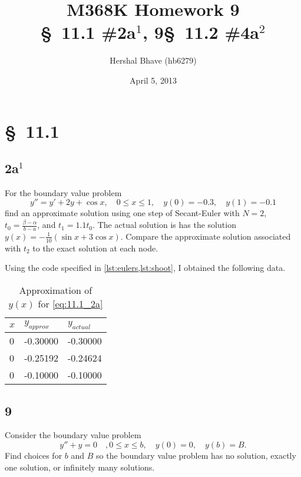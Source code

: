 \documentclass[12pt]{article}
\title{M368K Homework 9 \\
  \normalsize{\S~11.1 \#2a$^1$, 9\quad \S~11.2 \#4a$^2$}}
\author{Hershal Bhave (hb6279)}
\date{April 5, 2013}
\begin{document}
\maketitle

\section{\S~11.1}
\subsection{2a$^1$}
For the boundary value problem 
\begin{equation}
  \label{eq:11.1_2a}
  y''=y'+2y+\cos x,\quad 0\leq x \leq 1,\quad y(0)=-0.3,\quad y(1)=-0.1
\end{equation}
find an approximate solution using one step of Secant-Euler with
$N=2$, $t_0=\frac{\beta-\alpha}{b-a}$, and $t_1=1.1t_0$. The actual
solution is has the solution $y(x)=-\frac{1}{10}(\sin x + 3\cos
x)$. Compare the approximate solution associated with $t_2$ to the
exact solution at each node.

Using the code specified in \cref{lst:eulers,lst:shoot}, I obtained the following
data.

\begin{table}[h]
  \centering
  \begin{tabularx}{.5\textwidth}{XXX}
    \hline
    $x$ & $y_{approx}$ & $y_{actual}$ \\
    \hline
    0 &    -0.30000 &     -0.30000 \\
    0 &    -0.25192 &     -0.24624 \\
    0 &    -0.10000 &     -0.10000 \\
    \hline           
  \end{tabularx}
  \caption{Approximation of $y(x)$ for \cref{eq:11.1_2a}}
  \label{tab:2a_data}
\end{table}

\subsection{9}
Consider the boundary value problem 
\begin{equation}
  \label{eq:11.1_9}
  y''+y=0\quad, 0\leq x\leq b,\quad y(0)=0,\quad y(b)=B.
\end{equation}
Find choices for $b$ and $B$ so the boundary value problem has no solution, exactly one solution, or infinitely many solutions.
\end{document}
